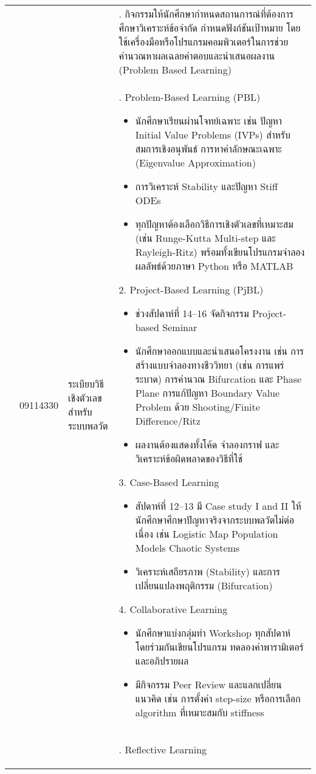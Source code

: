 {\begin{center}
\begin{longtable}{|p{}|p{}|p{}|>{\raggedcolumns}p{}|}
	&  & &
	3. กิจกรรมให้นักศึกษากำหนดสถานการณ์ที่ต้องการศึกษา\newline วิเคราะห์ข้อจำกัด กำหนดฟังก์ชันเป้าหมาย โดยใช้เครื่องมือหรือโปรแกรมคอมพิวเตอร์ในการช่วยคำนวณหาผลเฉลยคำตอบและนำเสนอผลงาน (Problem Based Learning)
	\\    
	\cline{2-4}
	& 09114330 &ระเบียบวิธีเชิงตัวเลขสำหรับระบบพลวัต & 1. Problem-Based Learning (PBL)
	\begin{itemize}
		\item นักศึกษาเรียนผ่านโจทย์เฉพาะ เช่น
		ปัญหา Initial Value Problems (IVPs) สำหรับสมการเชิงอนุพันธ์
		การหาค่าลักษณะเฉพาะ (Eigenvalue Approximation)
		\item การวิเคราะห์ Stability และปัญหา Stiff ODEs
		\item ทุกปัญหาต้องเลือกวิธีการเชิงตัวเลขที่เหมาะสม (เช่น Runge-Kutta Multi-step และ Rayleigh-Ritz) พร้อมทั้งเขียนโปรแกรมจำลองผลลัพธ์ด้วยภาษา Python หรือ MATLAB
	\end{itemize}
	2. Project-Based Learning (PjBL)
	\begin{itemize}
		\item ช่วงสัปดาห์ที่ 14–16 จัดกิจกรรม Project-based Seminar
		\item นักศึกษาออกแบบและนำเสนอโครงงาน เช่น
		การสร้างแบบจำลองทางชีววิทยา (เช่น การแพร่ระบาด)
		การคำนวณ Bifurcation และ Phase Plane
		การแก้ปัญหา Boundary Value Problem ด้วย Shooting/Finite Difference/Ritz
		\item ผลงานต้องแสดงทั้งโค้ด จำลองกราฟ และวิเคราะห์ข้อผิดพลาดของวิธีที่ใช้		
	\end{itemize}
	3. Case-Based Learning
	\begin{itemize}
		\item สัปดาห์ที่ 12–13 มี Case study I and II ให้นักศึกษาศึกษาปัญหาจริงจากระบบพลวัตไม่ต่อเนื่อง เช่น Logistic Map
		Population Models
		Chaotic Systems		
		\item วิเคราะห์เสถียรภาพ (Stability) และการเปลี่ยนแปลงพฤติกรรม (Bifurcation)
	\end{itemize}	
	4. Collaborative Learning
	\begin{itemize}
		\item นักศึกษาแบ่งกลุ่มทำ Workshop ทุกสัปดาห์ โดยร่วมกันเขียนโปรแกรม ทดลองค่าพารามิเตอร์ และอภิปรายผล
		\item มีกิจกรรม Peer Review และแลกเปลี่ยนแนวคิด เช่น การตั้งค่า step-size หรือการเลือก algorithm ที่เหมาะสมกับ stiffness
	\end{itemize}
		\\
	\hline
	& & &
	5. Reflective Learning
	\begin{itemize}

\end{itemize}
\end{longtable}
\end{center}}
